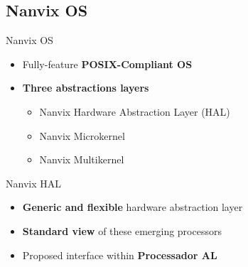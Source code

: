 

	\subsection{Nanvix OS}

		\begin{frame}[fragile]{Nanvix OS}

			\begin{itemize}
				\item Fully-feature \textbf{POSIX-Compliant OS}
			\end{itemize}

			\begin{itemize}
				\item \textbf{Three abstractions layers}
				\begin{itemize}
					\item Nanvix Hardware Abstraction Layer (HAL)
					\item Nanvix Microkernel
					\item Nanvix Multikernel
				\end{itemize}
			\end{itemize}

		\end{frame}

		\begin{frame}[fragile]{Nanvix HAL}

			\begin{itemize}
				\item \textbf{Generic and flexible} hardware abstraction layer
				\item \textbf{Standard view} of these emerging processors
				\item Proposed interface within \textbf{Processador AL}
			\end{itemize}


		\end{frame}

